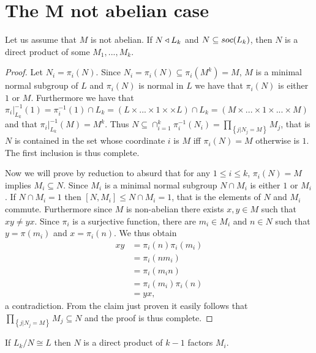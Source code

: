 \section{The M not abelian case}

\begin{theorem}
    \label{S4:Ndp}
    Let us assume that $M$ is not abelian. If $N \triangleleft L_k$ and $N \subseteq soc {(L_k)}$, then $N$ is a direct product of some $M_1,...,M_k$.
\end{theorem}

\begin{proof}
    Let $N_i = \pi_i(N)$. Since $N_i = \pi_i(N) \subseteq \pi_i(M^k) = M$, $M$ is a minimal normal subgroup of $L$ and $\pi_i(N)$ is normal in $L$ we have that $\pi_i(N)$ is either $1$ or $M$.
    Furthermore we have that $\pi_i|_{L_k}^{-1}(1) = \pi_i^{-1}(1) \cap L_k = (L \times ... \times 1 \times \times L) \cap L_k = (M \times ... \times 1 \times ... \times M)$ and that $\pi_i|_{L_k}^{-1}(M) = M^k$.
    Thus $N \subseteq \cap_{i=1}^k \pi_i^{-1}(N_i) = \prod_{\left\{j | N_j = M \right\}} M_j$, that is $N$ is contained in the set whose coordinate $i$ is $M$ iff $\pi_i(N) = M$ otherwise is $1$. The first inclusion is thus complete.

    Now we will prove by reduction to absurd that for any $1 \le i \le k$, $\pi_i(N) = M$ implies $M_i \subseteq N$. Since $M_i$ is a minimal normal subgroup $N \cap M_i$ is either $1$ or $M_i$. If $N \cap M_i = 1$ then $[N, M_i] \le N \cap M_i = 1$, that is the elements of $N$ and $M_i$ commute. Furthermore since $M$ is non-abelian there exists $x,y \in M$ such that $xy \ne yx$. Since $\pi_i$ is a surjective function, there are $m_i \in M_i$ and $n \in N$ such that $y= \pi(m_i)$ and $x = \pi_i(n)$. We thus obtain 
    \begin{align*}
        xy &= \pi_i(n)\pi_i(m_i) \\ 
           &= \pi_i(nm_i) \\
           &= \pi_i(m_in) \\
           &= \pi_i(m_i)\pi_i(n) \\
           &=yx,
    \end{align*}
    a contradiction.
    From the claim just proven it easily follows that $\prod_{\left\{j | N_j = M \right\}} M_j \subseteq N$ and the proof is thus complete.

\end{proof}

\begin{theorem}
    \label{S4:Ndpkm1}
    If $L_k/N \cong L$ then $N$ is a direct product of $k-1$ factors $M_i$.
\end{theorem}

